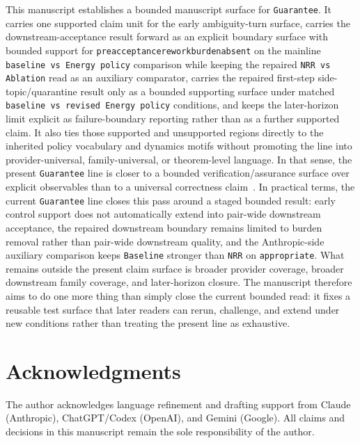 \documentclass[11pt]{article}
\renewcommand{\_}{\textunderscore\hspace{0pt}}
\begin{document}
This manuscript establishes a bounded manuscript surface for \texttt{Guarantee}.
It carries one supported claim unit for the early ambiguity-turn surface,
carries the downstream-acceptance result forward as an explicit boundary
surface with bounded support for
\texttt{preacceptance\_rework\_burden\_absent} on the mainline
\texttt{baseline vs Energy policy} comparison while keeping the repaired
\texttt{NRR vs Ablation} read as an auxiliary comparator, carries the repaired
first-step side-topic/quarantine result only as a bounded supporting surface
under matched \texttt{baseline vs revised Energy policy} conditions, and keeps
the later-horizon limit explicit as failure-boundary reporting rather than as
a further supported claim. It also ties those supported and unsupported regions
directly to the inherited policy vocabulary and dynamics motifs without
promoting the line into provider-universal, family-universal, or theorem-level
language. In that sense, the present \texttt{Guarantee} line is closer to a
bounded verification/assurance surface over explicit observables than to a
universal correctness claim~\cite{seshia2022verifiedai,desai2019soter}. In
practical terms, the current \texttt{Guarantee} line closes this
pass around a staged bounded result: early control support does not
automatically extend into pair-wide downstream acceptance, the repaired
downstream boundary remains limited to burden removal rather than pair-wide
downstream quality, and the Anthropic-side auxiliary comparison keeps
\texttt{Baseline} stronger than \texttt{NRR} on \texttt{appropriate}. What
remains outside the present claim
surface is broader provider coverage, broader downstream family coverage, and
later-horizon closure. The manuscript therefore aims to do one more thing than
simply close the current bounded read: it fixes a reusable test surface that
later readers can rerun, challenge, and extend under new conditions rather
than treating the present line as exhaustive.

\section*{Acknowledgments}
The author acknowledges language refinement and drafting support from Claude
(Anthropic), ChatGPT/Codex (OpenAI), and Gemini (Google). All claims and
decisions in this manuscript remain the sole responsibility of the author.
\end{document}
